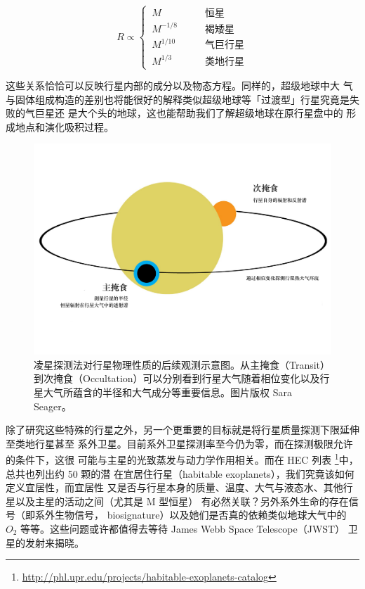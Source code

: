 \[
R \propto \left\{
  \begin{array}{lr}
       \,   M            &  \qquad \text{恒星} 	   \\
       \,   M^{-1/8}  &  \qquad \text{褐矮星} 	   \\
       \,   M^{1/10} &  \qquad \text{气巨行星}   \\
       \,   M^{1/3}   &  \qquad \text{类地行星} 
  \end{array}
\right.
\]

这些关系恰恰可以反映行星内部的成分以及物态方程\cite{Zapolsky1969}。同样的，超级地球中大
气与固体组成构造的差别也将能很好的解释类似超级地球等「过渡型」行星究竟是失败的气巨星还
是大个头的地球\cite{Rogers2015a,Lissauer2014}，这也能帮助我们了解超级地球在原行星盘中的
形成地点和演化吸积过程\cite{Miguel2011,Haghighipour2013}。

\begin{figure}[t]
\centering
\includegraphics[width=1.0\textwidth]{figures/chapter5/fig1_eclipsing.pdf}
\caption{凌星探测法对行星物理性质的后续观测示意图。从主掩食（Transit）到次掩食（Occultation）可以分别看到行星大气随着相位变化以及行星大气所蕴含的半径和大气成分等重要信息。图片版权 Sara Seager。}
\label{fig:transitspectro}
\end{figure}


除了研究这些特殊的行星之外，另一个更重要的目标就是将行星质量探测下限延伸至类地行星甚至
系外卫星。目前系外卫星探测率至今仍为零\cite{Kipping2011}，而在探测极限允许的条件下，这很
可能与主星的光致蒸发与动力学作用相关\cite{Yang2016}。而在 HEC 列表
\footnote{\url{http://phl.upr.edu/projects/habitable-exoplanets-catalog}}中，总共也列出约 50 颗的潜
在宜居住行星（habitable exoplanets），我们究竟该如何定义宜居性\cite{Kasting1993}，而宜居性
又是否与行星本身的质量、温度、大气与液态水、其他行星以及主星的活动之间（尤其是 M 型恒星）
有必然关联\cite{Kasting2003,Segura2005,Scalo2007}？另外系外生命的存在信号（即系外生物信号，
biosignature）以及她们是否真的依赖类似地球大气中的 $O_2$ 等等。这些问题或许都值得去等待
James Webb Space Telescope（JWST） 卫星的发射来揭晓。


